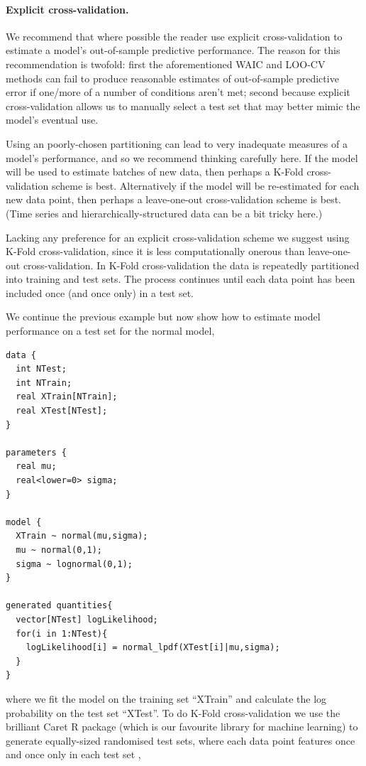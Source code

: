 \documentclass[11pt,fullpage]{book}
\begin{document}
\paragraph{Explicit cross-validation.} 
We recommend that where possible the reader use explicit cross-validation to estimate a model's out-of-sample predictive performance. The reason for this recommendation is twofold: first the aforementioned WAIC and LOO-CV methods can fail to produce reasonable estimates of out-of-sample predictive error if one/more of a number of conditions aren't met; second because explicit cross-validation allows us to manually select a test set that may better mimic the model's eventual use.

Using an poorly-chosen partitioning can lead to very inadequate measures of a model's performance, and so we recommend thinking carefully here. If the model will be used to estimate batches of new data, then perhaps a K-Fold cross-validation scheme is best. Alternatively if the model will be re-estimated for each new data point, then perhaps a leave-one-out cross-validation scheme is best. (Time series and hierarchically-structured data can be a bit tricky here.)

Lacking any preference for an explicit cross-validation scheme we suggest using K-Fold cross-validation, since it is less computationally onerous than leave-one-out cross-validation. In K-Fold cross-validation the data is repeatedly partitioned into training and test sets. The process continues until each data point has been included once (and once only) in a test set.

We continue the previous example but now show how to estimate model performance on a test set for the normal model, 


\begin{verbatim}
data { 
  int NTest; 
  int NTrain;
  real XTrain[NTrain]; 
  real XTest[NTest];
} 

parameters { 
  real mu;
  real<lower=0> sigma;
}

model { 
  XTrain ~ normal(mu,sigma);
  mu ~ normal(0,1);
  sigma ~ lognormal(0,1);
}

generated quantities{
  vector[NTest] logLikelihood;
  for(i in 1:NTest){
    logLikelihood[i] = normal_lpdf(XTest[i]|mu,sigma);
  }
}
\end{verbatim}

where we fit the model on the training set ``XTrain'' and calculate the log probability on the test set ``XTest''. To do K-Fold cross-validation we use the brilliant Caret R package (which is our favourite library for machine learning) to generate equally-sized randomised test sets, where each data point features once and once only in each test set \cite{caret2012},
\end{document}
